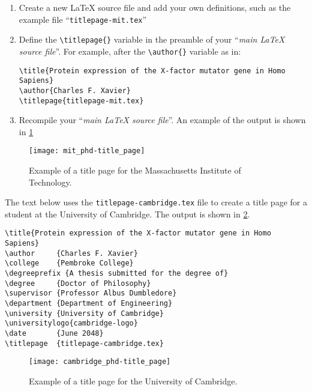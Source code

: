 \begin{enumerate}

    \item Create a new LaTeX source file and add your own definitions, such as the example file ``\verb|titlepage-mit.tex|''

    \item Define the \verb|\titlepage{}| variable in the preamble of your ``\textit{main LaTeX source file}''. For example, after the \verb|\author{}| variable as in:


\begin{lstlisting}[style=custom-latex]
\title{Protein expression of the X-factor mutator gene in Homo Sapiens}
\author{Charles F. Xavier}
\titlepage{titlepage-mit.tex}
\end{lstlisting}


    \item Recompile your ``\textit{main LaTeX source file}''. An example of the output is shown in \cref{fig:ch0:mit_phd-title_page}


\end{enumerate}



\begin{figure}[htb]
    \centering
    \texttt{[image: mit\_phd-title\_page]}
    \caption[Example of a title page for the Massachusetts Institute of Technology]
    {
        Example of a title page for the Massachusetts Institute of Technology.
        \label{fig:ch0:mit_phd-title_page}
    }
\end{figure}


The text below uses the \verb|titlepage-cambridge.tex| file to create a title page for a student at the University of Cambridge. The output is shown in \cref{fig:ch0:cambridge_phd-title_page}.


\begin{lstlisting}[style=custom-latex]
\title{Protein expression of the X-factor mutator gene in Homo Sapiens}
\author     {Charles F. Xavier}
\college    {Pembroke College}
\degreeprefix {A thesis submitted for the degree of}
\degree     {Doctor of Philosophy}
\supervisor {Professor Albus Dumbledore}
\department {Department of Engineering}
\university {University of Cambridge}
\universitylogo{cambridge-logo}
\date       {June 2048}
\titlepage  {titlepage-cambridge.tex}
\end{lstlisting}


\begin{figure}[htb]
    \centering
    \texttt{[image: cambridge\_phd-title\_page]}
    \caption[Example of a title page for the University of Cambridge]
    {
        Example of a title page for the University of Cambridge.
        \label{fig:ch0:cambridge_phd-title_page}
    }
\end{figure}


